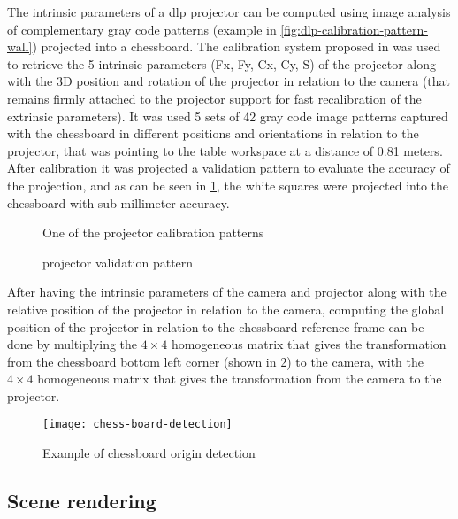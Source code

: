 The intrinsic parameters of a \gls{dlp} projector can be computed using image analysis of complementary gray code patterns (example in \cref{fig:dlp-calibration-pattern-wall}) projected into a chessboard. The calibration system proposed in \cite{Moreno2012} was used to retrieve the 5 intrinsic parameters (Fx, Fy, Cx, Cy, S) of the projector along with the 3D position and rotation of the projector in relation to the camera (that remains firmly attached to the projector support for fast recalibration of the extrinsic parameters). It was used 5 sets of 42 gray code image patterns captured with the chessboard in different positions and orientations in relation to the projector, that was pointing to the table workspace at a distance of 0.81 meters. After calibration it was projected a validation pattern to evaluate the accuracy of the projection, and as can be seen in \cref{fig:dlp-projected-chessboard}, the white squares were projected into the chessboard with sub-millimeter accuracy.

\begin{figure}[H]
	\begin{floatrow}[2]
		{\caption{One of the  projector calibration patterns}\label{fig:dlp-calibration-pattern-wall}}
		{\caption{ projector validation pattern}\label{fig:dlp-projected-chessboard}}
	\end{floatrow}
\end{figure}

After having the intrinsic parameters of the camera and projector along with the relative position of the projector in relation to the camera, computing the global position of the projector in relation to the chessboard reference frame can be done by multiplying the $4 \times 4$ homogeneous matrix that gives the transformation from the chessboard bottom left corner (shown in \cref{fig:chess-board-detection}) to the camera, with the $4 \times 4$ homogeneous matrix that gives the transformation from the camera to the projector.

\begin{figure}[H]
	\centering
	\texttt{[image: chess-board-detection]}
	\caption{Example of chessboard origin detection}
	\label{fig:chess-board-detection}
\end{figure}


\subsection{Scene rendering}

